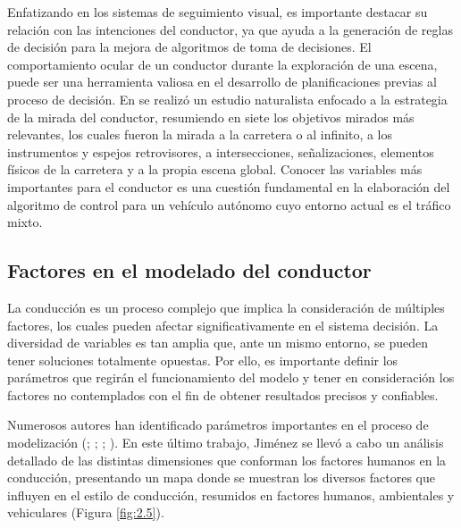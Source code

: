 Enfatizando en los sistemas de seguimiento visual, es importante destacar su relación con las intenciones del conductor, ya que ayuda a la generación de reglas de decisión para la mejora de algoritmos de toma de decisiones. El comportamiento ocular de un conductor durante la exploración de una escena, puede ser una herramienta valiosa en el desarrollo de planificaciones previas al proceso de decisión. En \textcite{lappi} se realizó un estudio naturalista enfocado a la estrategia de la mirada del conductor, resumiendo en siete los objetivos mirados más relevantes, los cuales fueron la mirada a la carretera o al infinito, a los instrumentos y espejos retrovisores, a intersecciones, señalizaciones, elementos físicos de la carretera y a la propia escena global. Conocer las variables más importantes para el conductor es una cuestión fundamental en la elaboración del algoritmo de control para un vehículo autónomo cuyo entorno actual es el tráfico mixto. 

\subsection{Factores en el modelado del conductor}
La conducción es un proceso complejo que implica la consideración de múltiples factores, los cuales pueden afectar significativamente en el sistema decisión. La diversidad de variables es tan amplia que, ante un mismo entorno, se pueden tener soluciones totalmente opuestas. Por ello, es importante definir los parámetros que regirán el funcionamiento del modelo y tener en consideración los factores no contemplados con el fin de obtener resultados precisos y confiables.  

Numerosos autores han identificado parámetros importantes en el proceso de modelización (\cite{cacciabue}; \cite{hole}; \cite{saifuzzaman}; \cite{jimenez17}). En este último trabajo, Jiménez se llevó a cabo un análisis detallado de las distintas dimensiones que conforman los factores humanos en la conducción, presentando un mapa donde se muestran los diversos factores que influyen en el estilo de conducción, resumidos en factores humanos, ambientales y vehiculares (Figura \ref{fig:2.5}). 

